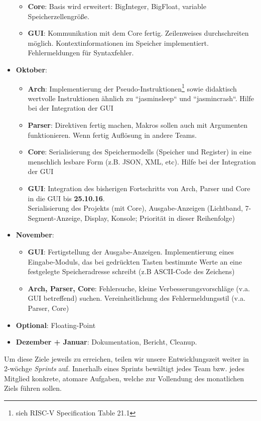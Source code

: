 \begin{itemize}
\begin{itemize}
      \item \textbf{Core}: Basis wird erweitert: BigInteger, BigFloat, variable Speicherzellengröße.
      \item \textbf{GUI}: Kommunikation mit dem Core fertig. Zeilenweises
        durchschreiten möglich. Kontextinformationen im Speicher
        implementiert. Fehlermeldungen für Syntaxfehler.
    \end{itemize}
  \item \textbf{Oktober}:
    \begin{itemize}
      \item \textbf{Arch}: Implementierung der Pseudo-Instruktionen\footnote{sieh RISC-V Specification Table 21.1} sowie didaktisch wertvolle Instruktionen ähnlich zu ``jasminsleep`` und ``jasmincrash``. Hilfe bei der Integration der GUI
      \item \textbf{Parser}: Direktiven fertig machen, Makros sollen auch mit Argumenten funktionieren. Wenn fertig Auflösung in andere Teams.
      \item \textbf{Core}: Serialisierung des Speichermodells (Speicher und Register) in eine menschlich lesbare Form (z.B. JSON, XML, etc). Hilfe bei der Integration der GUI
      \item \textbf{GUI}: Integration des bisherigen Fortschritts von Arch, Parser und Core in die GUI bis \textbf{25.10.16}.\\
      Serialisierung des Projekts (mit Core), Ausgabe-Anzeigen (Lichtband, 7-Segment-Anzeige, Display, Konsole; Priorität in dieser Reihenfolge)
    \end{itemize}
  \item \textbf{November}:
  \begin{itemize}
  	\item \textbf{GUI}: Fertigstellung der Ausgabe-Anzeigen. Implementierung eines Eingabe-Moduls, das bei gedrückten Tasten bestimmte Werte an eine festgelegte Speicheradresse schreibt (z.B ASCII-Code des Zeichens)
  	\item \textbf{Arch, Parser, Core}: Fehlersuche, kleine Verbesserungsvorschläge (v.a. GUI betreffend) suchen.
  	Vereinheitlichung des Fehlermeldungsstil (v.a. Parser, Core)
  \end{itemize}
  \item \textbf{Optional}: Floating-Point
  \item \textbf{Dezember + Januar}: Dokumentation, Bericht, Cleanup.
\end{itemize}


Um diese Ziele jeweils zu erreichen, teilen wir unsere Entwicklungszeit weiter
in 2-wöchge \emph{Sprints} auf. Innerhalb eines Sprints bewältigt jedes Team
bzw. jedes Mitglied konkrete, atomare Aufgaben, welche zur Vollendung des
monatlichen Ziels führen sollen.

